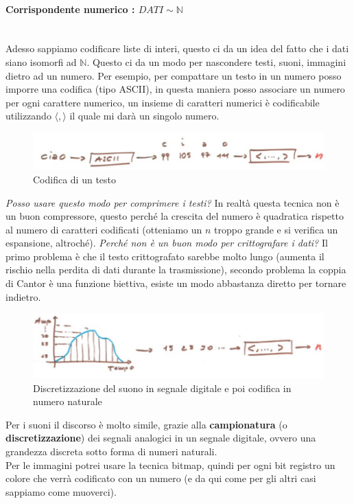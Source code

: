 \documentclass{article}
\begin{document}
\paragraph{Corrispondente numerico : $DATI\sim\mathbb{N}$}\mbox{}\\
Adesso sappiamo codificare liste di interi, questo ci da un idea del fatto che i dati siano
isomorfi ad $\mathbb{N}$. Questo ci da un modo per nascondere testi, suoni, immagini dietro ad
un numero. Per esempio, per compattare un testo in un numero posso imporre una codifica (tipo
ASCII), in questa maniera posso associare un numero per ogni carattere numerico, un insieme
di caratteri numerici è codificabile utilizzando $\langle , \rangle$ il quale mi darà un
singolo numero.
\begin{figure}[H]
    \centering
    \includegraphics[scale=0.4]{images/test_codifica.png}
    \caption{Codifica di un testo}
\end{figure}
\textit{Posso usare questo modo per comprimere i testi?} In realtà questa tecnica non
è un buon compressore, questo perché la crescita del numero è quadratica rispetto
al numero di caratteri codificati (otteniamo un $n$ troppo grande e si verifica un espansione,
altroché). \textit{Perché non è un buon modo per crittografare i dati?} Il primo problema
è che il testo crittografato sarebbe molto lungo (aumenta il rischio nella perdita
di dati durante la trasmissione), secondo problema la coppia di Cantor è una funzione biettiva,
esiste un modo abbastanza diretto per tornare indietro.
\begin{figure}[H]
    \centering
    \includegraphics[scale=0.4]{images/suono_codifica.png}
    \caption{Discretizzazione del suono in segnale digitale e poi codifica in numero naturale}
\end{figure}
Per i suoni il discorso è molto simile, grazie alla \textbf{campionatura} (o
\textbf{discretizzazione}) dei segnali analogici in un segnale digitale, ovvero una grandezza
discreta sotto forma di numeri naturali.\\Per le immagini potrei usare la tecnica bitmap,
quindi per ogni bit registro un colore che verrà codificato con un numero (e da qui come per
gli altri casi sappiamo come muoverci).
\end{document}
